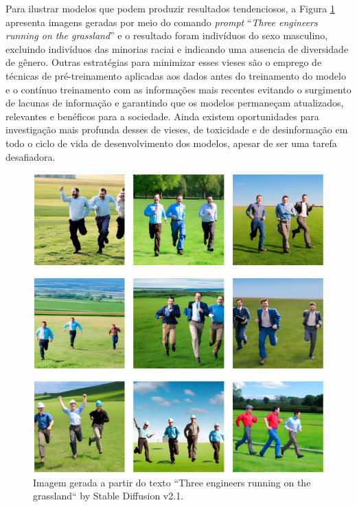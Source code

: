 Para ilustrar modelos que podem produzir resultados tendenciosos, a Figura \ref{fig:images_of_three_engineers} apresenta 
imagens geradas por meio do comando \textit{prompt} ``\textit{Three engineers running on the grassland}'' 
e o resultado foram indivíduos do sexo masculino, excluindo indivíduos das minorias raciai e
indicando uma ausencia de diversidade de gênero.
Outras estratégias para minimizar esses vieses são o emprego de técnicas de pré-treinamento aplicadas aos dados antes do treinamento do 
modelo e o contínuo treinamento com as informações mais recentes evitando o 
surgimento de lacunas de informação e garantindo que os modelos permaneçam atualizados, relevantes 
e benéficos para a sociedade. Ainda existem oportunidades para investigação mais profunda desses de vieses, de
toxicidade e de desinformação em todo o ciclo de vida de desenvolvimento dos modelos, 
apesar de ser uma tarefa desafiadora.


\begin{figure}
  \centering 
  \includegraphics[scale=0.47]{images_generated_with_text_three_engineers.png}
  \caption{Imagem gerada a partir do texto ``Three engineers running on the grassland``  by Stable Diffusion v2.1.}
  \label{fig:images_of_three_engineers}
\end{figure}


